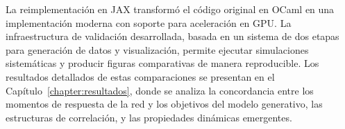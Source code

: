 La reimplementación en JAX transformó el código original en OCaml en una implementación moderna con soporte para aceleración en \acrshort{GPU}. La infraestructura de validación desarrollada, basada en un sistema de dos etapas para generación de datos y visualización, permite ejecutar simulaciones sistemáticas y producir figuras comparativas de manera reproducible. Los resultados detallados de estas comparaciones se presentan en el Capítulo~\ref{chapter:resultados}, donde se analiza la concordancia entre los momentos de respuesta de la red y los objetivos del modelo generativo, las estructuras de correlación, y las propiedades dinámicas emergentes.